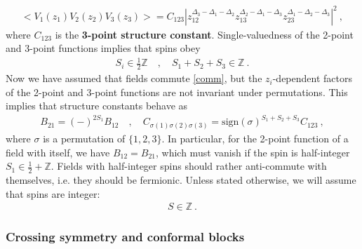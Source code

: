 \documentclass[12pt, a4paper]{article}
\theoremstyle{break}
\begin{document}
\begin{align}
 \boxed{  \Big< V_1(z_1)V_2(z_2)V_3(z_3) \Big> = C_{123} \left|z_{12}^{\Delta_3-\Delta_1-\Delta_2} z_{13}^{\Delta_2-\Delta_1-\Delta_3} z_{23}^{\Delta_1-\Delta_2-\Delta_3}\right|^2 }\ ,
 \label{3ptc}
\end{align}
where $C_{123}$ is the \textbf{3-point structure constant}. Single-valuedness of the 2-point and 3-point functions implies that spins obey
\begin{align}
 S_i\in\frac12 \mathbb{Z} \quad , \quad S_1+S_2+S_3 \in\mathbb{Z}\ . 
 \label{sihz}
\end{align}
Now we have assumed that fields commute \eqref{comm}, but the $z_i$-dependent factors of the 2-point and 3-point functions are not invariant under permutations. This implies that structure constants behave as
\begin{align}
 B_{21} = (-)^{2S_1} B_{12} \quad ,\quad C_{\sigma(1)\sigma(2)\sigma(3)} = \text{sign}(\sigma)^{S_1+S_2+S_3} C_{123}\ , 
 \label{b21}
\end{align}
where $\sigma$ is a permutation of $\{1,2,3\}$. In particular, for the 2-point function of a field with itself, we have $B_{12}=B_{21}$, which must vanish if the spin is half-integer $S_1\in \frac12+\mathbb{Z}$. Fields with half-integer spins should rather anti-commute with themselves, i.e. they should be fermionic. 
Unless stated otherwise, we will assume that spins are integer:
\begin{align}
 \boxed{S\in \mathbb{Z}}\ .
 \label{siz}
\end{align}

\subsubsection{Crossing symmetry and conformal blocks}
\end{document}
